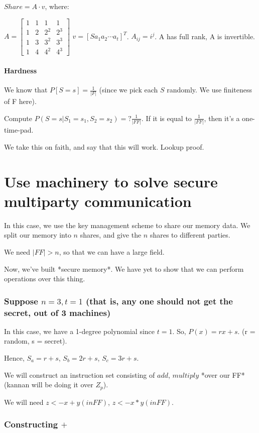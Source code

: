 $Share = A \cdot v$, where:


$A = \begin{bmatrix}
 1 & 1 & 1  & 1\\
 1 &2 &2^2  &2^3 \\
1 &3 &3^2 &3^3 \\
1 &4 &4^2 &4^3
\end{bmatrix}$
$v = [S a_1 a_2 \cdots a_t]^T$.
$A_{ij} = i^j $. A has full rank, A is invertible.

\paragraph{Hardness}
We know that $P[S=s] = \frac{1}{|F|}$ (since we pick each $S$ randomly. We use finiteness of F here).

Compute $P(S=s | S_1=s_1, S_2=s_2) =? \frac{1}{|FF|}$. If it is equal to $\frac{1}{|FF|}$, then it's a one-time-pad.

We take this on faith, and say that this will work. Lookup proof.


\section{Use machinery to solve secure multiparty communication}
In this case, we use the key management scheme to share our memory data.
We split our memory into $n$ shares, and give the $n$ shares to different parties.

We need $|FF| > n$, so that we can have a large field.

Now, we've built *secure memory*. We have yet to show that we can perform operations over this thing.

\subsubsection{Suppose $n = 3, t = 1$ (that is, any one should not get the secret, out of 3 machines)}


In this case, we have a 1-degree polynomial since $t = 1$. So, $P(x) = rx + s$.
(r = random, s = secret).

Hence, $S_a = r + s$, $S_b = 2r + s$, $S_c = 3r + s$.

We will construct an instruction set consisting of $add$, $multiply$ *over our FF* (kannan will be doing it over $Z_p$).

We will need $z <- x + y (in FF)$, $z <- x * y (in FF)$.


\subsubsection{Constructing $+$}

